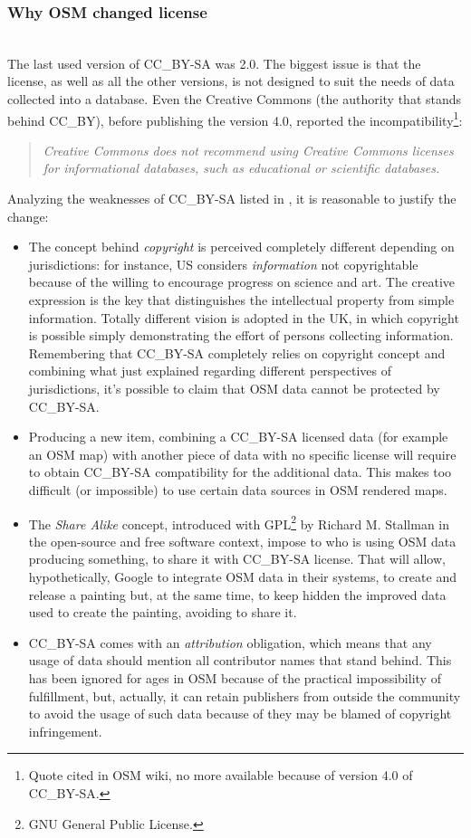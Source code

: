 \subsubsection{Why OSM changed license}~\\
The last used version of CC\_BY-SA was 2.0. The biggest issue is that the license, as well as all the other versions, is not designed to suit the needs of data collected into a database. Even the Creative Commons (the authority that stands behind CC\_BY), before publishing the version 4.0, reported the incompatibility\footnote{Quote cited in OSM wiki, no more available because of version 4.0 of CC\_BY-SA.}:
\begin{quote}
    \textit{Creative Commons does not recommend using Creative Commons licenses for informational databases, such as educational or scientific databases.}
\end{quote}
Analyzing the weaknesses of CC\_BY-SA listed in \cite{OSM2010why}, it is reasonable to justify the change:
\begin{itemize}
    \item The concept behind \textit{copyright} is perceived completely different depending on jurisdictions: for instance, US considers \textit{information} not copyrightable because of the willing to encourage progress on science and art. The creative expression is the key that distinguishes the intellectual property from simple information. Totally different vision is adopted in the UK, in which copyright is possible simply demonstrating the effort of persons collecting information.
    Remembering that CC\_BY-SA completely relies on copyright concept and combining what just explained regarding different perspectives of jurisdictions, it's possible to claim that OSM data cannot be protected by CC\_BY-SA.
    \item Producing a new item, combining a CC\_BY-SA licensed data (for example an OSM map) with another piece of data with no specific license will require to obtain CC\_BY-SA compatibility for the additional data. This makes too difficult (or impossible) to use certain data sources in OSM rendered maps.
    \item The \textit{Share Alike} concept, introduced with GPL\footnote{GNU General Public License.} by Richard M. Stallman in the open-source and free software context\cite{carver2005share}, impose to who is using OSM data producing something, to share it with CC\_BY-SA license. That will allow, hypothetically, Google to integrate OSM data in their systems, to create and release a painting but, at the same time, to keep hidden the improved data used to create the painting, avoiding to share it.
    \item CC\_BY-SA comes with an \textit{attribution} obligation, which means that any usage of data should mention all contributor names that stand behind. This has been ignored for ages in OSM because of the practical impossibility of fulfillment, but, actually, it can retain publishers from outside the community to avoid the usage of such data because of they may be blamed of copyright infringement.
\end{itemize}
